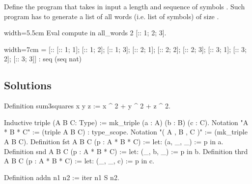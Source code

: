\begin{Exercise}[label=ex:allwords,difficulty=2,title={All words of size n}]
Define the  program that takes in input a
length  and sequence of symbols .
Such program has to generate a list of all words (i.e. list
of symbols) of size .

\begin{coq}{}{width=5.5cm}
Eval compute in
  all_words 2 [:: 1; 2; 3].
\end{coq}
\begin{coqout}{}{width=7cm}
 = [:: [:: 1; 1]; [:: 1; 2]; [:: 1; 3];
       [:: 2; 1]; [:: 2; 2]; [:: 2; 3];
       [:: 3; 1]; [:: 3; 2]; [:: 3; 3]]
 : seq (seq nat)
\end{coqout}
\end{Exercise}

\subsection{Solutions}

\begin{Answer}[ref=ex:3sum]
\begin{coq}{}{}
Definition sum3squares x y z := x ^ 2 + y ^ 2 + z ^ 2.
\end{coq}
\end{Answer}

\begin{Answer}[ref=ex:pair]

\begin{coq}{}{}
Inductive triple (A B C: Type) := mk_triple (a : A) (b : B) (c : C).
Notation "A * B * C" := (triple A B C) : type_scope.
Notation "( A , B , C )" := (mk_triple A B C).
Definition fst A B C (p : A * B * C) := let: (a, _, _) := p in a.
Definition snd A B C (p : A * B * C) := let: (_, b, _) := p in b.
Definition thrd A B C (p : A * B * C) := let: (_, _, c) := p in c.
\end{coq}

\end{Answer}

\begin{Answer}[ref=ex:iteradd]

\begin{coq}{}{}
Definition addn n1 n2 := iter n1 S n2.
\end{coq}

\end{Answer}

